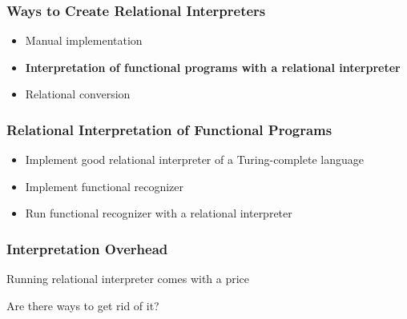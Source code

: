 \documentclass[xcolor=table]{beamer}
\begin{document}
\begin{frame}[fragile]
  \transwipe[direction=90]
  \frametitle{Ways to Create Relational Interpreters}
\begin{itemize}
	\item Manual implementation
	\item \textbf<2>{Interpretation of functional programs with a relational \linebreak interpreter}
	\item Relational conversion 
\end{itemize}
\end{frame}

\begin{frame}[fragile]
  \transwipe[direction=90]
  \frametitle{Relational Interpretation of Functional Programs}
\begin{itemize}
	\item Implement good relational interpreter of a Turing-complete language
	\item Implement functional recognizer
	\item Run functional recognizer with a relational  interpreter 
\end{itemize}
\end{frame}


\begin{frame}[fragile]
  \transwipe[direction=90]
  \frametitle{Interpretation Overhead}
\begin{center} 
Running relational interpreter comes with a price 
\end{center} 


\begin{center} 
Are there ways to get rid of it? 
\end{center} 

\end{frame}
\end{document}
